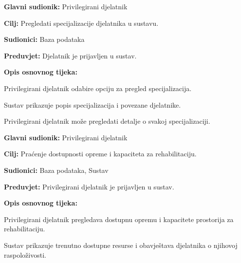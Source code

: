 \vspace{1em} %
\noindent{}
\begin{packed_item}
	\item \textbf{Glavni sudionik:} Privilegirani djelatnik
	\item \textbf{Cilj:} Pregledati specijalizacije djelatnika u sustavu.
	\item \textbf{Sudionici:} Baza podataka
	\item \textbf{Preduvjet:} Djelatnik je prijavljen u sustav.
	\item \textbf{Opis osnovnog tijeka:}
	\begin{packed_enum}
		\item Privilegirani djelatnik odabire opciju za pregled specijalizacija.
		\item Sustav prikazuje popis specijalizacija i povezane djelatnike.
		\item Privilegirani djelatnik može pregledati detalje o svakoj specijalizaciji.
	\end{packed_enum}
\end{packed_item}

\vspace{1em} %
\noindent{}
\begin{packed_item}
	\item \textbf{Glavni sudionik:} Privilegirani djelatnik
	\item \textbf{Cilj:} Praćenje dostupnosti opreme i kapaciteta za rehabilitaciju.
	\item \textbf{Sudionici:} Baza podataka, Sustav
	\item \textbf{Preduvjet:} Privilegirani djelatnik je prijavljen u sustav.
	\item \textbf{Opis osnovnog tijeka:}
	\begin{packed_enum}
		\item Privilegirani djelatnik pregledava dostupnu opremu i kapacitete prostorija za rehabilitaciju.
		\item Sustav prikazuje trenutno dostupne resurse i obavještava djelatnika o njihovoj raspoloživosti.
	\end{packed_enum}
\end{packed_item}

